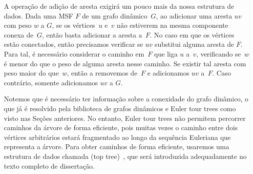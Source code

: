 A operação de adição de aresta exigirá um pouco mais da nossa estrutura de dados. Dada uma MSF $F$ de um grafo dinâmico~$G$, ao adicionar uma aresta $uv$ com peso $w$ a $G$, se os vértices~$u$ e~$v$ não estiverem na mesma componente conexa de~$G$, então basta adicionar a aresta a~$F$. No caso em que os vértices estão conectados, então precisamos verificar se $uv$ substitui alguma aresta de $F$. Para tal, é necessário considerar o caminho em~$F$ que liga $u$ a~$v$, verificando se~$w$ é menor do que o peso de alguma aresta nesse caminho. Se existir tal aresta com peso maior do que~$w$, então a removemos de~$F$ e adicionamos $uv$ a~$F$. Caso contrário, somente adicionamos $uv$ a $G$.

Notemos que é necessário ter informação sobre a conexidade do grafo dinâmico, o que já é resolvido pela biblioteca de grafos dinâmicos e Euler tour trees como visto nas Seções anteriores. No entanto, Euler tour trees não permitem percorrer caminhos da árvore de forma eficiente, pois muitas vezes o caminho entre dois vértices arbitrários estará fragmentado ao longo da sequência Euleriana que representa a árvore. Para obter caminhos de forma eficiente, usaremos uma estrutura de dados chamada  (top tree)~\cite{AHLTMinDiameter}, que será introduzida adequadamente no texto completo de dissertação.

